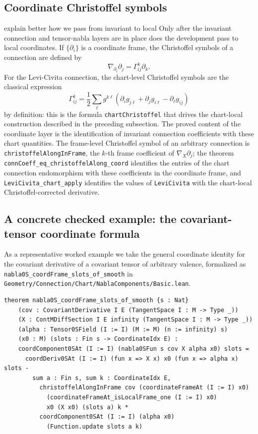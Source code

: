 \documentclass[11pt]{article}
\theoremstyle{plain}
\theoremstyle{definition}
\theoremstyle{remark}
\newcommand{\leanref}[1]{\nolinkurl{#1}}
\newcommand{\leanfile}[1]{\nolinkurl{#1}}
\newcommand{\rffile}[1]{\leanfile{#1}}
\begin{document}
\subsection{Coordinate Christoffel symbols}
{\color{red} explain better how we pass from invariant to local}
Only after the invariant connection and tensor-nabla layers are in place does
the development pass to local coordinates.  If $\{\partial_i\}$ is a
coordinate frame, the Christoffel symbols of a connection are defined by
\[
  \nabla_{\partial_i}\partial_j
  =
  \Gamma^k_{ij}\partial_k.
\]
For the Levi-Civita connection, the chart-level Christoffel symbols are the
classical expression
\[
  \Gamma^k_{ij}
  =
  \frac12
  \sum_\ell g^{k\ell}
  \left(
    \partial_i g_{j\ell}
    +
    \partial_j g_{i\ell}
    -
    \partial_\ell g_{ij}
  \right)
\]
by definition: this is the formula \leanref{chartChristoffel} that drives the
chart-local construction described in the preceding subsection.  The proved
content of the coordinate layer is the identification of invariant connection
coefficients with these chart quantities.  The frame-level Christoffel symbol
of an arbitrary connection is \leanref{christoffelAlongInFrame}, the $k$-th
frame coefficient of $\nabla_X\partial_j$; the theorem
\leanref{connCoeff_eq_christoffelAlong_coord} identifies the entries of the
chart connection endomorphism with these coefficients in the coordinate
frame, and \leanref{LeviCivita_chart_apply} identifies the values of
\leanref{LeviCivita} with the chart-local Christoffel-corrected derivative.
\subsection{A concrete checked example: the covariant-tensor coordinate formula}

As a representative worked example we take the general coordinate identity for
the covariant derivative of a covariant tensor of arbitrary valence,
formalized as \leanref{nabla0S_coordFrame_slots_of_smooth} in
\rffile{Geometry/Connection/Chart/NablaComponents/Basic.lean}.

\begin{Verbatim}[breaklines=true,breakanywhere=true,fontsize=\small]
theorem nabla0S_coordFrame_slots_of_smooth {s : Nat}
    (cov : CovariantDerivative I E (TangentSpace I : M -> Type _))
    (X : ContMDiffSection I E infinity (TangentSpace I : M -> Type _))
    (alpha : Tensor0SField (I := I) (M := M) (n := infinity) s)
    (x0 : M) (slots : Fin s -> CoordinateIdx E) :
    coordComponent0SAt (I := I) (nabla0SFun s cov X alpha x0) slots =
      coordDeriv0SAt (I := I) (fun x => X x) x0 (fun x => alpha x) slots -
        sum a : Fin s, sum k : CoordinateIdx E,
          christoffelAlongInFrame cov (coordinateFrameAt (I := I) x0)
            (coordinateFrameAt_isLocalFrame_one (I := I) x0)
            x0 (X x0) (slots a) k *
          coordComponent0SAt (I := I) (alpha x0)
            (Function.update slots a k)
\end{Verbatim}
\end{document}
